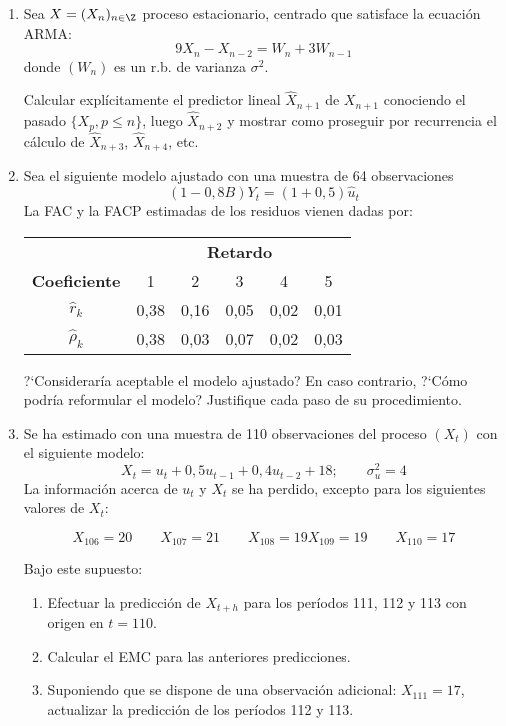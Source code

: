 \begin{enumerate}
 \item Sea $X=(X_{n} )_{n\in \Z} $ proceso estacionario, centrado que satisface la ecuaci\'{o}n ARMA:
\[
9X_{n} -X_{n-2} =W_{n} +3W_{n-1} 
\]
donde $(W_{n})$ es un r.b. de varianza $\sigma^{2}$.\newline

Calcular expl\'{i}citamente el predictor lineal $\widehat{X}_{n+1} $ de $X_{n+1} $ conociendo el pasado $\{ {X_{p} ,p\le n} \}$, luego $\widehat{X}_{n+2} $ y mostrar como proseguir por recurrencia el c\'{a}lculo de $\widehat{X}_{n+3}$, $\widehat{X}_{n+4} $, etc.

\item Sea el siguiente modelo ajustado con una muestra de 64 observaciones
\[
(1-0,8B)Y_{t} =(1+0,5){\widehat{u}_{t} } 
\]
La FAC y la FACP estimadas de los residuos vienen dadas por:

\begin{center}
\begin{tabular}{@{}cccccc@{}}
\toprule
&\multicolumn{5}{c}{\textbf{Retardo}} \\
\cmidrule{2-6}
\textbf{Coeficiente} & 1& 2& 3& 4& 5 \\
\midrule
$\widehat{r}_{k} $ & 0,38& 0,16& 0,05& 0,02& 0,01 \\
$\widehat{\rho}_{k} $ & 0,38& 0,03& 0,07& 0,02& 0,03 \\
\bottomrule
\end{tabular}
\end{center}

?`Considerar\'{i}a aceptable el modelo ajustado? En caso contrario, ?`C\'{o}mo podr\'{i}a reformular el modelo? Justifique cada paso de su procedimiento.

\item Se ha estimado con una muestra de 110 observaciones del proceso $(X_{t} )$ con el siguiente modelo:
\[
X_{t} =u_{t} +0,5u_{t-1} +0,4u_{t-2} +18;\qquad\sigma_{u}^{2} =4
\]
La informaci\'{o}n acerca de $u_{t}$ y $ X_{t}$ se ha perdido, excepto para los siguientes valores de $X_{t}$:

\[
X_{{106}}=20\qquad X_{{107}}=21\qquad X_{108}=19 X_{109}=19\qquad X_{{110}}=17
\]

Bajo este supuesto:
\begin{enumerate}
\item Efectuar la predicci\'{o}n de $X_{t+h} $ para los per\'{i}odos 111, 112 y 113 con origen en $t = 110$.
\item Calcular el EMC para las anteriores predicciones.
\item Suponiendo que se dispone de una observaci\'{o}n adicional: $X_{111}=17$, actualizar la predicci\'{o}n de los per\'{i}odos 112 y 113.
\end{enumerate}


\end{enumerate}
